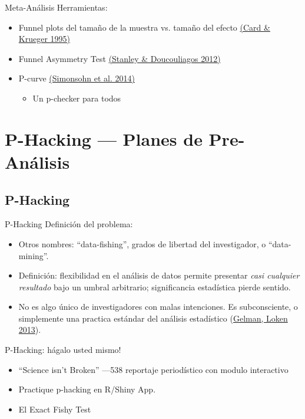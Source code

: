 \documentclass{beamer}
\begin{document}
\begin{frame}{Meta-Análisis}
Herramientas:
\begin{itemize}[<.->]
\item Funnel plots del tamaño de la muestra vs. tamaño del efecto  \href{http://www.jstor.org/stable/2117925}{(Card \& Krueger 1995)}
\item Funnel Asymmetry Test \href{https://books.google.com/books?id=jSQEdEsL7VoC}{(Stanley \& Doucouliagos 2012)}
\item P-curve \href{http://p-curve.com/}{(Simonsohn et al. 2014)} \href{http://p-curve.com/}{}
\begin{itemize}
	\item Un p-checker para todos \href{http://shinyapps.org/apps/p-checker/}{}	
\end{itemize}
\end{itemize}
\end{frame}
\section{P-Hacking --- Planes de Pre-Análisis}
\subsection*{P-Hacking}
\begin{frame}[<.->]{P-Hacking}
Definición del problema:
\begin{itemize}
\item
Otros nombres: ``data-fishing'', grados de libertad del investigador, o ``data-mining''.
\item
Definición: flexibilidad en el análisis de datos permite presentar \textit{casi cualquier resultado} bajo un umbral arbitrario; significancia estadística pierde sentido.
\item
No es algo único de investigadores con malas intenciones. Es subconsciente, o simplemente una practica estándar del análisis estadístico (\href{http://www.stat.columbia.edu/~gelman/research/unpublished/p_hacking.pdf}{Gelman, Loken 2013}).
\end{itemize}
\end{frame}

\begin{frame}{P-Hacking: hágalo usted mismo!}
\begin{itemize}
\item
``Science isn't Broken'' ---538 reportaje periodístico con modulo interactivo \href{http://fivethirtyeight.com/features/science-isnt-broken}{}
\item 
Practique p-hacking en R/Shiny App. \href{http://www.nicebread.de/introducing-p-hacker/}{}
\item
El Exact Fishy Test \href{https://macartan.shinyapps.io/fish/}{}
\end{itemize}
\end{frame}
\end{document}
